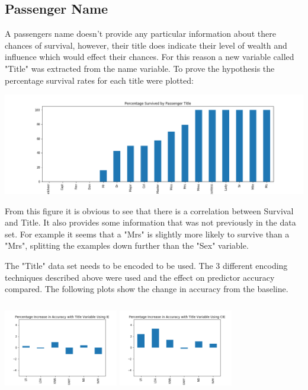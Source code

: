 \documentclass{article}
\begin{document}
\subsection{Passenger Name}
A passengers name doesn't provide any particular information about there chances of survival, however, their title does indicate their level of wealth and influence which would effect their chances. For this reason a new variable called "Title" was extracted from the name variable. To prove the hypothesis the percentage survival rates for each title were plotted:
\par
\includegraphics[width=\textwidth]{Percentage_Survived_by_Passenger_Title}
\par
From this figure it is obvious to see that there is a correlation between Survival and Title. It also provides some information that was not previously in the data set. For example it seems that a "Mrs" is slightly more likely to survive than a "Mrs", splitting the examples down further than the "Sex" variable.
\par
The "Title" data set needs to be encoded to be used. The 3 different encoding techniques described above were used and the effect on predictor accuracy compared. The following plots show the change in accuracy from the baseline.
\par
\includegraphics[width=5cm, height=4cm]{Percentage_Increase_in_Accuracy_with_Title_Variable_Using_IE}
\includegraphics[width=5cm, height=4cm]{Percentage_Increase_in_Accuracy_with_Title_Variable_Using_CIE}
\end{document}
